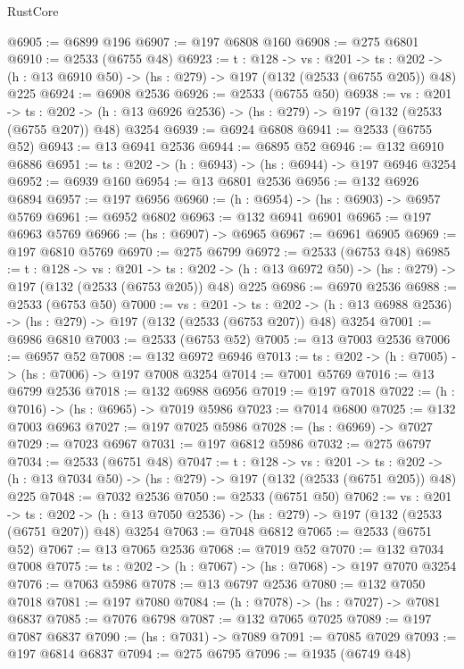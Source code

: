 \begin{lexlean}{RustCore}
\begin{coremodule}
@6905 := @6899 @196
@6907 := @197 @6808 @160
@6908 := @275 @6801
@6910 := @2533 (@6755 @48)
@6923 := {t : @128} ->
  {vs : @201} ->
  {ts : @202} -> (h : @13 @6910 @50) -> (hs : @279) -> @197 (@132 (@2533 (@6755 @205)) @48) @225
@6924 := @6908 @2536
@6926 := @2533 (@6755 @50)
@6938 := {vs : @201} ->
  {ts : @202} -> (h : @13 @6926 @2536) -> (hs : @279) -> @197 (@132 (@2533 (@6755 @207)) @48) @3254
@6939 := @6924 @6808
@6941 := @2533 (@6755 @52)
@6943 := @13 @6941 @2536
@6944 := @6895 @52
@6946 := @132 @6910 @6886
@6951 := {ts : @202} -> (h : @6943) -> (hs : @6944) -> @197 @6946 @3254
@6952 := @6939 @160
@6954 := @13 @6801 @2536
@6956 := @132 @6926 @6894
@6957 := @197 @6956
@6960 := (h : @6954) -> (hs : @6903) -> @6957 @5769
@6961 := @6952 @6802
@6963 := @132 @6941 @6901
@6965 := @197 @6963 @5769
@6966 := (hs : @6907) -> @6965
@6967 := @6961 @6905
@6969 := @197 @6810 @5769
@6970 := @275 @6799
@6972 := @2533 (@6753 @48)
@6985 := {t : @128} ->
  {vs : @201} ->
  {ts : @202} -> (h : @13 @6972 @50) -> (hs : @279) -> @197 (@132 (@2533 (@6753 @205)) @48) @225
@6986 := @6970 @2536
@6988 := @2533 (@6753 @50)
@7000 := {vs : @201} ->
  {ts : @202} -> (h : @13 @6988 @2536) -> (hs : @279) -> @197 (@132 (@2533 (@6753 @207)) @48) @3254
@7001 := @6986 @6810
@7003 := @2533 (@6753 @52)
@7005 := @13 @7003 @2536
@7006 := @6957 @52
@7008 := @132 @6972 @6946
@7013 := {ts : @202} -> (h : @7005) -> (hs : @7006) -> @197 @7008 @3254
@7014 := @7001 @5769
@7016 := @13 @6799 @2536
@7018 := @132 @6988 @6956
@7019 := @197 @7018
@7022 := (h : @7016) -> (hs : @6965) -> @7019 @5986
@7023 := @7014 @6800
@7025 := @132 @7003 @6963
@7027 := @197 @7025 @5986
@7028 := (hs : @6969) -> @7027
@7029 := @7023 @6967
@7031 := @197 @6812 @5986
@7032 := @275 @6797
@7034 := @2533 (@6751 @48)
@7047 := {t : @128} ->
  {vs : @201} ->
  {ts : @202} -> (h : @13 @7034 @50) -> (hs : @279) -> @197 (@132 (@2533 (@6751 @205)) @48) @225
@7048 := @7032 @2536
@7050 := @2533 (@6751 @50)
@7062 := {vs : @201} ->
  {ts : @202} -> (h : @13 @7050 @2536) -> (hs : @279) -> @197 (@132 (@2533 (@6751 @207)) @48) @3254
@7063 := @7048 @6812
@7065 := @2533 (@6751 @52)
@7067 := @13 @7065 @2536
@7068 := @7019 @52
@7070 := @132 @7034 @7008
@7075 := {ts : @202} -> (h : @7067) -> (hs : @7068) -> @197 @7070 @3254
@7076 := @7063 @5986
@7078 := @13 @6797 @2536
@7080 := @132 @7050 @7018
@7081 := @197 @7080
@7084 := (h : @7078) -> (hs : @7027) -> @7081 @6837
@7085 := @7076 @6798
@7087 := @132 @7065 @7025
@7089 := @197 @7087 @6837
@7090 := (hs : @7031) -> @7089
@7091 := @7085 @7029
@7093 := @197 @6814 @6837
@7094 := @275 @6795
@7096 := @1935 (@6749 @48)

\end{coremodule}
\end{lexlean}
